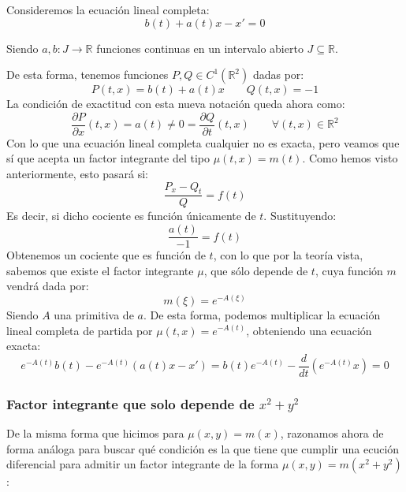 \begin{ejemplo}
    Consideremos la ecuación lineal completa:
    \begin{equation*}
        b(t) + a(t)x - x' = 0
    \end{equation*}

    Siendo $a,b:J\rightarrow\mathbb{R}$ funciones continuas en un intervalo abierto $J\subseteq \mathbb{R}$.

    De esta forma, tenemos funciones $P,Q\in C^1(\mathbb{R}^2)$ dadas por:
    \begin{equation*}
        P(t,x) = b(t) + a(t)x \qquad Q(t,x) = -1
    \end{equation*}
    La condición de exactitud con esta nueva notación queda ahora como:
    \begin{equation*}
        \dfrac{\partial P}{\partial x}(t,x) = a(t) \neq 0 = \dfrac{\partial Q}{\partial t}(t,x) \qquad \forall (t,x)\in \mathbb{R}^2
    \end{equation*}
    Con lo que una ecuación lineal completa cualquier no es exacta, pero veamos que sí que acepta un factor integrante del tipo $\mu(t,x)=m(t)$. Como hemos visto anteriormente, esto pasará si:
    \begin{equation*}
        \dfrac{P_x-Q_t}{Q} = f(t)
    \end{equation*}
    Es decir, si dicho cociente es función únicamente de $t$. Sustituyendo:
    \begin{equation*}
        \dfrac{a(t)}{-1} = f(t)
    \end{equation*}
    Obtenemos un cociente que es función de $t$, con lo que por la teoría vista, sabemos que existe el factor integrante $\mu$, que sólo depende de $t$, cuya función $m$ vendrá dada por:
    \begin{equation*}
        m(\xi) = e^{-A(\xi)}
    \end{equation*}
    Siendo $A$ una primitiva de $a$. De esta forma, podemos multiplicar la ecuación lineal completa de partida por $\mu(t,x) = e^{-A(t)}$, obteniendo una ecuación exacta:
    \begin{equation*}
        e^{-A(t)}b(t) - e^{-A(t)}(a(t)x - x') = b(t)e^{-A(t)} - \dfrac{d}{dt}\left(e^{-A(t)}x\right) = 0
    \end{equation*}
\end{ejemplo}

\subsubsection{Factor integrante que solo depende de $x^2+y^2$}
De la misma forma que hicimos para $\mu(x,y)=m(x)$, razonamos ahora de forma análoga para buscar qué condición es la que tiene que cumplir una ecución diferencial para admitir un factor integrante de la forma $\mu(x,y)=m(x^2+y^2)$:


